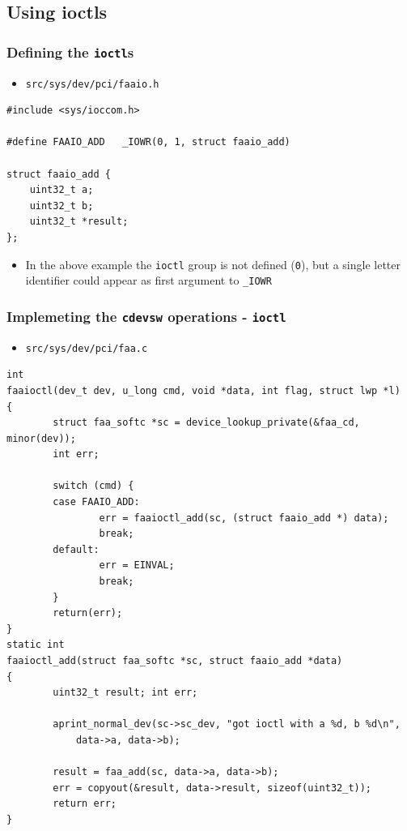\documentclass[dvipsnames,table]{beamer}
\begin{document}
\subsection{Using ioctls}

\begin{frame}[fragile]
\frametitle{Defining the {\tt ioctl}s}
\begin{itemize}
\item {\tt src/sys/dev/pci/faaio.h}
\end{itemize}
\begin{lstlisting}
#include <sys/ioccom.h>
                     
#define FAAIO_ADD	_IOWR(0, 1, struct faaio_add)

struct faaio_add {
    uint32_t a;
    uint32_t b;
    uint32_t *result;
};
\end{lstlisting}
\begin{itemize}
	\item In the above example the {\tt ioctl} group is not defined ({\tt0}), but a single letter identifier could appear as first argument to {\tt\_IOWR}
\end{itemize}
\end{frame}

\begin{frame}[fragile]
\frametitle{Implemeting the {\tt cdevsw} operations - {\tt ioctl}}
\begin{itemize}
	\item {\tt src/sys/dev/pci/faa.c}
\end{itemize}
\begin{lstlisting}
int
faaioctl(dev_t dev, u_long cmd, void *data, int flag, struct lwp *l)
{
        struct faa_softc *sc = device_lookup_private(&faa_cd, minor(dev));
        int err;

        switch (cmd) {
        case FAAIO_ADD:
                err = faaioctl_add(sc, (struct faaio_add *) data);
                break;
        default:
                err = EINVAL;
                break;
        }
        return(err);
}
static int
faaioctl_add(struct faa_softc *sc, struct faaio_add *data)
{
        uint32_t result; int err;

        aprint_normal_dev(sc->sc_dev, "got ioctl with a %d, b %d\n",
            data->a, data->b);

        result = faa_add(sc, data->a, data->b);
        err = copyout(&result, data->result, sizeof(uint32_t));
        return err;
}
\end{lstlisting}
\end{frame}
\end{document}
